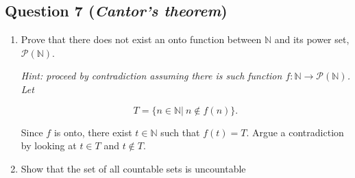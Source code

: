 \documentclass{article}
\begin{document}
        

\subsection*{Question 7 (\textit{Cantor's theorem})}



\begin{enumerate}
    \item Prove that there does not exist an onto function between $\mathbb{N}$ and its power set, $\mathcal{P}(\mathbb{N})$.\\

 {\it Hint: proceed by contradiction assuming there is such function $f:\mathbb{N} \rightarrow \mathcal{P}(\mathbb{N})$. Let 
 
 \[
 T=\{n\in \mathbb{N}|~n\notin f(n) \}.
 \]

Since $f$ is onto, there exist $t\in \mathbb{N}$ such that $f(t)=T$. Argue a contradiction by looking at $t\in T$ and $t\notin T$.}
\item Show that the set of all countable sets is uncountable

\end{enumerate}


\end{document}
